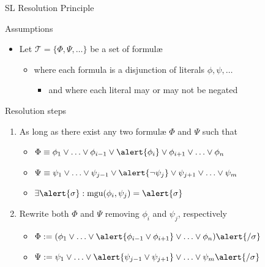 \documentclass[presentation]{beamer}\mode<presentation>{\usetheme{AMSBolognaFC}}
\begin{document}
\begin{frame}[allowframebreaks]{SL Resolution Principle}
    \begin{block}{\small Assumptions}
        \begin{itemize}\small
            \item Let $\mathcal{T} = \{ \Phi, \Psi, \ldots \}$ be a set of formul\ae{}
            \begin{itemize}\footnotesize
                \item where each formula is a \alert{disjunction of literals} $\phi, \psi, \ldots$
                \begin{itemize}\scriptsize
                    \item and where each literal may or may not be \alert{negated}
                \end{itemize}
            \end{itemize}
        \end{itemize}
    \end{block}
    \begin{alertblock}{Resolution steps}
        \begin{enumerate}
            \item As long as there \alert{exist} any two formul\ae{} \alert{$\Phi$} and \alert{$\Psi$} such that
            \begin{itemize}
                \item $\Phi \equiv \phi_1 \vee \ldots \vee \phi_{i-1} \vee \alert{\phi_i} \vee \phi_{i+1} \vee \ldots \vee \phi_{n}$
                \item $\Psi \equiv \psi_1 \vee \ldots \vee \psi_{j-1} \vee \alert{\neg\psi_j} \vee \psi_{j+1} \vee \ldots \vee \psi_{m}$
                \item $\exists \alert{\sigma} : \text{mgu}(\phi_i, \psi_j) = \alert{\sigma}$
            \end{itemize}

            \item Rewrite both $\Phi$ and $\Psi$ removing $\phi_i$ and $\psi_j$, respectively
            \begin{itemize}
                \item $\Phi := (\phi_1 \vee \ldots \vee \alert{\phi_{i-1} \vee \phi_{i+1}} \vee \ldots \vee \phi_{n}) \alert{/ \sigma} $
                \item $\Psi := \psi_1 \vee \ldots \vee \alert{\psi_{j-1} \vee \psi_{j+1}} \vee \ldots \vee \psi_{m} \alert{/ \sigma}$
            \end{itemize}


\end{enumerate}
\end{alertblock}
\end{frame}
\end{document}

